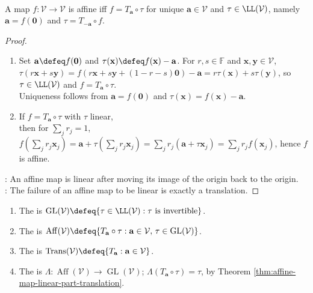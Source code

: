 \begin{theorem} \label{thm:affine-map-linear-part-translation} \\
A map $f:\mathcal{V}\to\mathcal{V}$ is affine iff $f=T_{\mathbf{a}}\circ\tau$ for unique $\mathbf{a}\in\mathcal{V}$ and $\tau\in\LL(\mathcal{V})$, namely $\mathbf{a}=f(\mathbf{0})$ and $\tau=T_{-\mathbf{a}}\circ f$.
\begin{proof}
\begin{enumerate}[label=\roman*.]
\setlength{\itemsep}{0pt}
\item[$(\Rightarrow)$] Set $\mathbf{a}\defeq f(\mathbf{0})$ and $\tau(\mathbf{x})\defeq f(\mathbf{x})-\mathbf{a}$. For $r,s\in\mathbb{F}$ and $\mathbf{x},\mathbf{y}\in\mathcal{V}$,\\
$\tau(r\mathbf{x}+s\mathbf{y}) =f(r\mathbf{x}+s\mathbf{y}+(1-r-s)\mathbf{0})-\mathbf{a} =r\tau(\mathbf{x})+s\tau(\mathbf{y})$, so $\tau\in\LL(\mathcal{V})$ and $f=T_{\mathbf{a}}\circ\tau$.\\
Uniqueness follows from $\mathbf{a}=f(\mathbf{0})$ and $\tau(\mathbf{x})=f(\mathbf{x})-\mathbf{a}$.
\item[$(\Leftarrow)$] If $f=T_{\mathbf{a}}\circ\tau$ with $\tau$ linear,\\
then for $\sum\limits_j r_j=1$, $f\left(\sum\limits_j r_j\mathbf{x}_j\right) =\mathbf{a}+\tau\left(\sum\limits_j r_j\mathbf{x}_j\right) =\sum\limits_j r_j(\mathbf{a}+\tau\mathbf{x}_j) =\sum\limits_j r_j f(\mathbf{x}_j)$, hence $f$ is affine.
\end{enumerate}
: An affine map is linear after moving its image of the origin back to the origin.\\
: The failure of an affine map to be linear is exactly a translation.
\end{proof}
\end{theorem}

\begin{definition} \label{def:affine-group-translations-linear-part} 
\begin{enumerate}[label=(\roman*)]
\setlength{\itemsep}{0pt}
\item The  is $\operatorname{GL}(\mathcal{V})\defeq\{\tau\in\LL(\mathcal{V}):\tau \text{ is invertible}\}$.
\item The  is $\operatorname{Aff}(\mathcal{V})\defeq\{T_{\mathbf{a}}\circ\tau:\mathbf{a}\in\mathcal{V},\,\tau\in\operatorname{GL}(\mathcal{V})\}$.
\item The  is $\operatorname{Trans}(\mathcal{V})\defeq\{T_{\mathbf{a}}:\mathbf{a}\in\mathcal{V}\}$.
\item The  is $\Lambda:\operatorname{Aff}(\mathcal{V})\to\operatorname{GL}(\mathcal{V})$; $\Lambda(T_{\mathbf{a}}\circ\tau)=\tau$, by Theorem \ref{thm:affine-map-linear-part-translation}.
\end{enumerate}
\end{definition}

